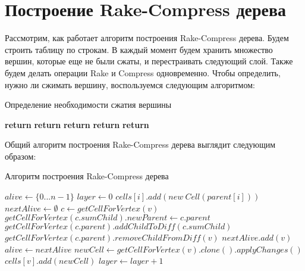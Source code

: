\FloatBarrier
\section{Построение Rake-Compress дерева}   

Рассмотрим, как работает алгоритм построения Rake-Compress дерева. Будем строить таблицу по строкам.
В каждый момент будем хранить множество вершин, которые еще не были сжаты, и перестраивать следующий слой.
Также будем делать операции Rake и Compress одновременно. Чтобы определить, нужно ли сжимать вершину, 
воспользуемся следующим алгоритмом:

\FloatBarrier
\begin{algorithm}
\caption{Определение необходимости сжатия вершины}\label{algo:check_rake_compress}
\begin{algorithmic}[1]
		\State \textbf{return} \algorithmictrue {}
	\EndIf
		\State \textbf{return} \algorithmicfalse
	\EndIf
		\State \textbf{return} \algorithmicfalse {}
	\EndIf
		\State \textbf{return} \algorithmictrue
	\EndIf
	\State \textbf{return} \algorithmicfalse
\EndProcedure

\end{algorithmic}
\end{algorithm}

Общий алгоритм построения Rake-Compress дерева выглядит следующим образом:

\FloatBarrier
\begin{algorithm}
\caption{Алгоритм построения Rake-Compress дерева}\label{algo:building_rc}
\begin{algorithmic}[1]
\State $alive \gets \{0...n - 1\}$
\State $layer \gets 0$
	\State $cells[i].add(new \ Cell(parent[i]))$ 
\EndFor
{}
	\State $nextAlive \gets \emptyset$
		\State $c \gets getCellForVertex(v)$
				\State $getCellForVertex(c.sumChild).newParent \gets c.parent$
				\State $getCellForVertex(c.parent).addChildToDiff(c.sumChild)$
			\EndIf
				\State $getCellForVertex(c.parent).removeChildFromDiff(v)$
			\EndIf
		\Else
			\State $nextAlive.add(v)$
		\EndIf
	\EndFor
	\State $alive \gets nextAlive$
		\State $newCell \gets getCellForVertex(v).clone().applyChanges()$ 
		\State $cells[v].add(newCell)$
	\EndFor
	\State $layer \gets layer + 1$
\EndWhile
\end{algorithmic}
\end{algorithm}

